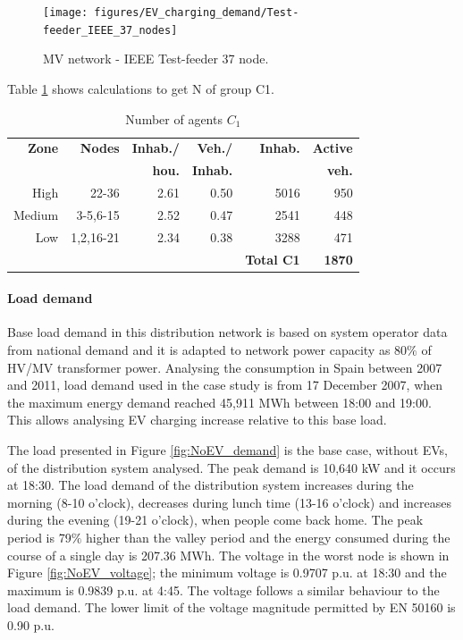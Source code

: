 \documentclass[a4paper,11pt,twoside,openright]{report}
\begin{document}
\begin{figure}[htbp]
	\centering
	\texttt{[image: figures/EV\_charging\_demand/Test-feeder\_IEEE\_37\_nodes]}
	\caption{MV network - IEEE Test-feeder 37 node.}
	\label{fig:37nodes}
\end{figure}

Table \ref{tab:connection_point} shows calculations to get N of group C1.

\begin{table}[htbp]
	\centering
	\caption{Number of agents $ C_{1} $}
	\label{tab:connection_point}
	\begin{tabular}{rrrrrr}
		
		
		{\bf Zone} & {\bf Nodes}  & {\bf Inhab./}& {\bf Veh./} & {\bf Inhab.}  & {\bf Active} \\
		
		{\bf } & {\bf } & {\bf hou.} & {\bf Inhab.} &   {\bf } &      {\bf veh.} \\
		\hline
		High & 22-36 & 2.61& 0.50 & 5016 & 950 \\
		
		Medium & 3-5,6-15 & 2.52 & 0.47  & 2541 &  448 \\
		
		Low & 1,2,16-21 & 2.34 & 0.38 & 3288 &  471 \\
		\hline
		& &  & & \textbf{Total C1}& {\bf 1870} \\
		\hline
	\end{tabular}  
\end{table}

\paragraph{\textbf{Load demand}}
Base load demand in this distribution network is based on system operator data \cite{ree} from national demand and it is adapted to network power capacity as 80$\%$ of HV/MV transformer power. Analysing the consumption in Spain between 2007 and 2011, load demand used in the case study is from 17 December 2007, when the maximum energy demand reached 45,911 MWh between 18:00 and 19:00. This allows analysing EV charging increase relative to this base load. 

The load presented in Figure \ref{fig:NoEV_demand} is the base case, without EVs, of the distribution system analysed. The peak demand is 10,640 kW and it occurs at 18:30. The load demand of the distribution system increases during the morning (8-10 o'clock), decreases during lunch time (13-16 o'clock) and increases during the evening (19-21 o'clock), when people come back home. The peak period is 79$\%$ higher than the valley period and the energy consumed during the course of a single day is 207.36 MWh. The voltage in the worst node is shown in Figure \ref{fig:NoEV_voltage}; the minimum voltage is 0.9707 p.u. at 18:30 and the maximum is 0.9839 p.u. at 4:45. The voltage follows a similar behaviour to the load demand. The lower limit of the voltage magnitude permitted by EN 50160 is 0.90 p.u.
\end{document}

